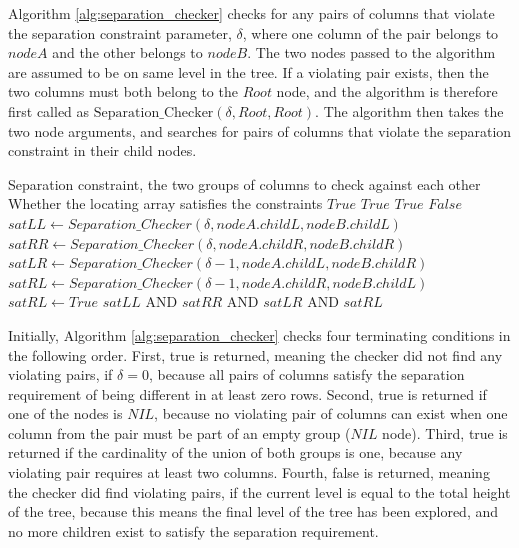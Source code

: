 Algorithm \ref{alg:separation_checker} checks for any pairs of columns that violate the separation constraint parameter, $\delta$, where one column of the pair belongs to $\mathit{nodeA}$ and the other belongs to $\mathit{nodeB}$.
The two nodes passed to the algorithm are assumed to be on same level in the tree.
If a violating pair exists, then the two columns must both belong to the $\mathit{Root}$ node, and the algorithm is therefore first called as $\mathrm{Separation\_Checker}(\delta,\mathit{Root},\mathit{Root})$.
The algorithm then takes the two node arguments, and searches for pairs of columns that violate the separation constraint in their child nodes.

\begin{algorithm}[pthb]
\caption{$\mathrm{Separation\_Checker}(\delta,\mathit{nodeA},\mathit{nodeB})$}
\label{alg:separation_checker}

\begin{algorithmic}[1]
\REQUIRE Separation constraint, the two groups of columns to check against each other
\ENSURE Whether the locating array satisfies the constraints
	\RETURN $True$
	\RETURN $True$
	\RETURN $True$
	\RETURN $False$
\ENDIF
\STATE $\mathit{satLL} \gets Separation\_Checker(\delta,\mathit{nodeA.childL},\mathit{nodeB.childL})$
\STATE $\mathit{satRR} \gets Separation\_Checker(\delta,\mathit{nodeA.childR},\mathit{nodeB.childR})$
\STATE $\mathit{satLR} \gets Separation\_Checker(\delta-1,\mathit{nodeA.childL},\mathit{nodeB.childR})$
	\STATE $\mathit{satRL} \gets Separation\_Checker(\delta-1,\mathit{nodeA.childR},\mathit{nodeB.childL})$
\ELSE
	\STATE $satRL \gets True$
\ENDIF
\RETURN $satLL$ AND $satRR$ AND $satLR$ AND $satRL$
\end{algorithmic}
\end{algorithm}

Initially, Algorithm \ref{alg:separation_checker} checks four terminating conditions in the following order.
First, true is returned, meaning the checker did not find any violating pairs, if $\delta = 0$, because all pairs of columns satisfy the separation requirement of being different in at least zero rows.
Second, true is returned if one of the nodes is $\mathit{NIL}$, because no violating pair of columns can exist when one column from the pair must be part of an empty group ($\mathit{NIL}$ node).
Third, true is returned if the cardinality of the union of both groups is one, because any violating pair requires at least two columns.
Fourth, false is returned, meaning the checker did find violating pairs, if the current level is equal to the total height of the tree, because this means the final level of the tree has been explored, and no more children exist to satisfy the separation requirement.

